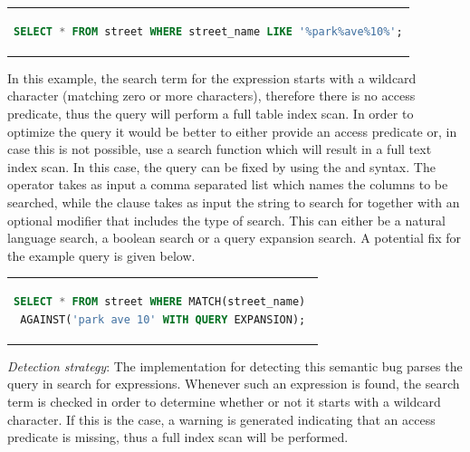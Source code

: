 \begin{center}
\begin{tabular}{c}
\begin{lstlisting}[language=SQL]
SELECT * FROM street WHERE street_name LIKE '%park%ave%10%';
\end{lstlisting}
\end{tabular}
\end{center}

In this example, the search term for the  expression starts with a wildcard character (matching zero or more characters), therefore there is no access predicate, thus the query will perform a full table index scan. In order to optimize the query it would be better to either provide an access predicate or, in case this is not possible, use a search function which will result in a full text index scan. In this case, the query can be fixed by using the  and  syntax. The  operator takes as input a comma separated list which names the columns to be searched, while the  clause takes as input the string to search for together with an optional modifier that includes the type of search. This can either be a natural language search, a boolean search or a query expansion search. A potential fix for the example query is given below.

\begin{center}
\begin{tabular}{c}
\begin{lstlisting}[language=SQL]
SELECT * FROM street WHERE MATCH(street_name) 
AGAINST('park ave 10' WITH QUERY EXPANSION);
\end{lstlisting}
\end{tabular}
\end{center}

\noindent \emph{Detection strategy}: The implementation for detecting this semantic bug parses the query in search for  expressions. Whenever such an expression is found, the search term is checked in order to determine whether or not it starts with a wildcard character. If this is the case, a warning is generated indicating that an access predicate is missing, thus a full index scan will be performed.

